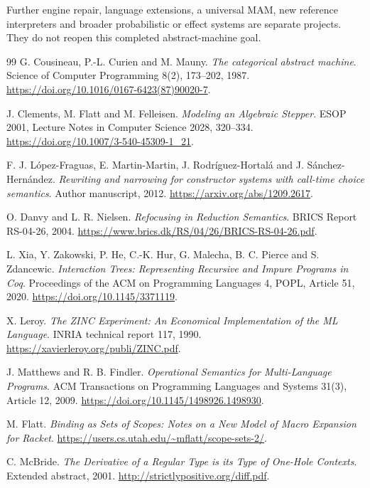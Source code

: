 \documentclass[11pt,a4paper]{article}
\begin{document}
Further engine repair, language extensions, a universal MAM, new reference
interpreters and broader probabilistic or effect systems are separate projects.
They do not reopen this completed abstract-machine goal.

\begin{thebibliography}{99}
G. Cousineau, P.-L. Curien and M. Mauny.
\emph{The categorical abstract machine}.
Science of Computer Programming 8(2), 173--202, 1987.
\url{https://doi.org/10.1016/0167-6423(87)90020-7}.

J. Clements, M. Flatt and M. Felleisen.
\emph{Modeling an Algebraic Stepper}.
ESOP 2001, Lecture Notes in Computer Science 2028, 320--334.
\url{https://doi.org/10.1007/3-540-45309-1_21}.

F. J. L\'opez-Fraguas, E. Martin-Martin, J. Rodr\'iguez-Hortal\'a and J. S\'anchez-Hern\'andez.
\emph{Rewriting and narrowing for constructor systems with call-time choice semantics}.
Author manuscript, 2012.
\url{https://arxiv.org/abs/1209.2617}.

O. Danvy and L. R. Nielsen.
\emph{Refocusing in Reduction Semantics}.
BRICS Report RS-04-26, 2004.
\url{https://www.brics.dk/RS/04/26/BRICS-RS-04-26.pdf}.

L. Xia, Y. Zakowski, P. He, C.-K. Hur, G. Malecha, B. C. Pierce and S. Zdancewic.
\emph{Interaction Trees: Representing Recursive and Impure Programs in Coq}.
Proceedings of the ACM on Programming Languages 4, POPL, Article 51, 2020.
\url{https://doi.org/10.1145/3371119}.

X. Leroy. \emph{The ZINC Experiment: An Economical Implementation of the ML Language}.
INRIA technical report 117, 1990.
\url{https://xavierleroy.org/publi/ZINC.pdf}.

J. Matthews and R. B. Findler.
\emph{Operational Semantics for Multi-Language Programs}.
ACM Transactions on Programming Languages and Systems 31(3), Article 12, 2009.
\url{https://doi.org/10.1145/1498926.1498930}.

M. Flatt. \emph{Binding as Sets of Scopes: Notes on a New Model of Macro
Expansion for Racket}.
\url{https://users.cs.utah.edu/~mflatt/scope-sets-2/}.

C. McBride. \emph{The Derivative of a Regular Type is its Type of One-Hole
Contexts}. Extended abstract, 2001.
\url{http://strictlypositive.org/diff.pdf}.


\end{thebibliography}
\end{document}
